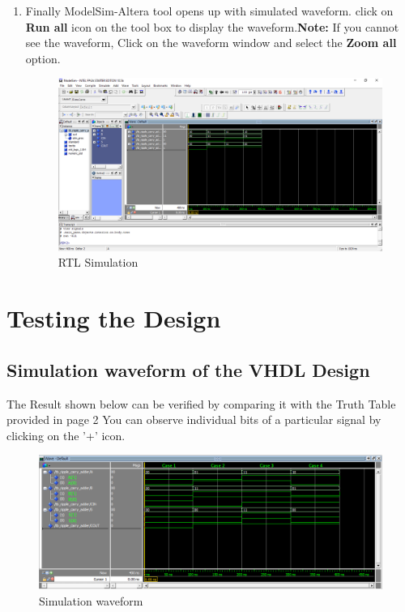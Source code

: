 \documentclass[12pt,singleside,a4paper]{article}
\begin{document}
\begin{enumerate}
        \item Finally ModelSim-Altera tool opens up with simulated waveform. click on \textbf{Run all} icon on the tool box to display the waveform.\textbf{Note:} If you cannot see the waveform, Click on the waveform window and select the \textbf{Zoom all} option.
            \begin{figure}[H]
                \centering
                \includegraphics[width=14cm,keepaspectratio]{img29.png}
            \caption{RTL Simulation}
            \end{figure}
        
    \end{enumerate}
\newpage
\section{Testing the Design}

\subsection{Simulation waveform of the VHDL Design}
The Result shown below can be verified by comparing it with the Truth Table provided in page 2
You can observe individual bits of a particular signal by clicking on the '+' icon.
\begin{figure}[H]
    \centering
    \includegraphics[width = 14cm,keepaspectratio]{img30.png}
\caption{Simulation waveform}
\end{figure}
\end{document}
